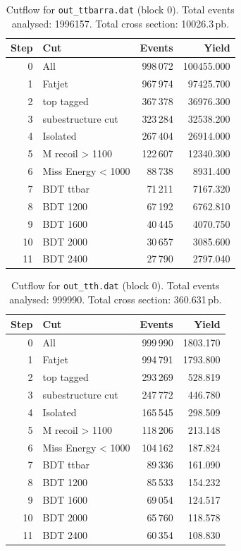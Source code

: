 \documentclass{article}
\begin{document}
\begin{table}[H]
\centering
\begin{tabular}{r l r r}
\toprule
Step & Cut & Events & Yield \\
\midrule
0 & All & 998\,072 & 100455.000 \\
1 & Fatjet & 967\,974 & 97425.700 \\
2 & top tagged & 367\,378 & 36976.300 \\
3 & subestructure cut & 323\,284 & 32538.200 \\
4 & Isolated & 267\,404 & 26914.000 \\
5 & M recoil > 1100 & 122\,607 & 12340.300 \\
6 & Miss Energy < 1000 & 88\,738 & 8931.400 \\
7 & BDT ttbar & 71\,211 & 7167.320 \\
8 & BDT 1200 & 67\,192 & 6762.810 \\
9 & BDT 1600 & 40\,445 & 4070.750 \\
10 & BDT 2000 & 30\,657 & 3085.600 \\
11 & BDT 2400 & 27\,790 & 2797.040 \\
\bottomrule
\end{tabular}
\caption{Cutflow for \texttt{out\_ttbarra.dat} (block 0). Total events analysed: 1996157. Total cross section: 10026.3\,pb.}
\label{tab:cutflow-out-ttbarra-dat}
\end{table}

\begin{table}[H]
\centering
\begin{tabular}{r l r r}
\toprule
Step & Cut & Events & Yield \\
\midrule
0 & All & 999\,990 & 1803.170 \\
1 & Fatjet & 994\,791 & 1793.800 \\
2 & top tagged & 293\,269 & 528.819 \\
3 & subestructure cut & 247\,772 & 446.780 \\
4 & Isolated & 165\,545 & 298.509 \\
5 & M recoil > 1100 & 118\,206 & 213.148 \\
6 & Miss Energy < 1000 & 104\,162 & 187.824 \\
7 & BDT ttbar & 89\,336 & 161.090 \\
8 & BDT 1200 & 85\,533 & 154.232 \\
9 & BDT 1600 & 69\,054 & 124.517 \\
10 & BDT 2000 & 65\,760 & 118.578 \\
11 & BDT 2400 & 60\,354 & 108.830 \\
\bottomrule
\end{tabular}
\caption{Cutflow for \texttt{out\_tth.dat} (block 0). Total events analysed: 999990. Total cross section: 360.631\,pb.}
\label{tab:cutflow-out-tth-dat}
\end{table}
\end{document}
